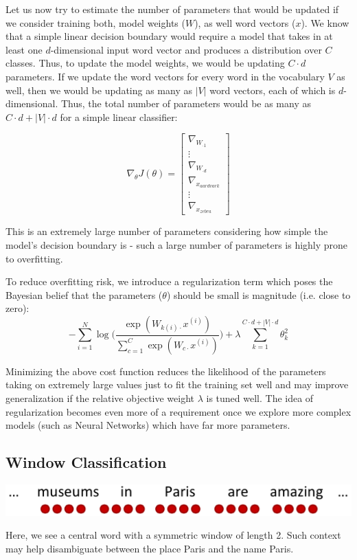 \documentclass{tufte-handout}
\begin{document}
Let us now try to estimate the number of parameters that would be updated if we consider training both, model weights ($W$), as well word vectors ($x$). We know that a simple linear decision boundary would require a model that takes in at least one $d$-dimensional input word vector and produces a distribution over $C$ classes. Thus, to update the model weights, we would be updating $C\cdot d$ parameters. If we update the word vectors for every word in the vocabulary $V$ as well, then we would be updating as many as $|V|$ word vectors, each of which is $d$-dimensional. Thus, the total number of parameters would be as many as $C\cdot d + |V|\cdot d$ for a simple linear classifier:

$$\nabla_{\theta} J(\theta) = \left[ \begin{array}{c} \nabla_{W_{\cdot 1}} \\  \vdots \\  \nabla_{W_{\cdot d}} \\ \nabla_{x_{aardvark}} \\ \vdots  \\ \nabla_{x_{zebra}} \end{array} \right] $$

This is an extremely large number of parameters considering how simple the model's decision boundary is - such a large number of parameters is highly prone to overfitting.

To reduce overfitting risk, we introduce a regularization term which poses the Bayesian belief that the parameters ($\theta$) should be small is magnitude (i.e. close to zero):
$$-\sum_{i = 1}^N\log \bigg(\frac{\exp(W_{k{(i)}\cdot}x^{(i)})}{\sum_{c=1}^C\exp(W_{c\cdot}x^{(i)})}\bigg) + \lambda \sum_{k=1}^{C\cdot d + |V|\cdot d} \theta_k^2$$

Minimizing the above cost function reduces the likelihood of the parameters taking on extremely large values just to fit the training set well and may improve generalization if the relative objective weight $\lambda$ is tuned well. The idea of regularization becomes even more of a requirement once we explore more complex models (such as Neural Networks) which have far more parameters.

\subsection{Window Classification}

\begin{marginfigure}%
  \includegraphics[width = \linewidth]{window}
  \caption{Here, we see a central word with a symmetric window of length 2. Such context may help disambiguate between the place Paris and the name Paris.}
    \label{fig:window}
\end{marginfigure}
\end{document}
